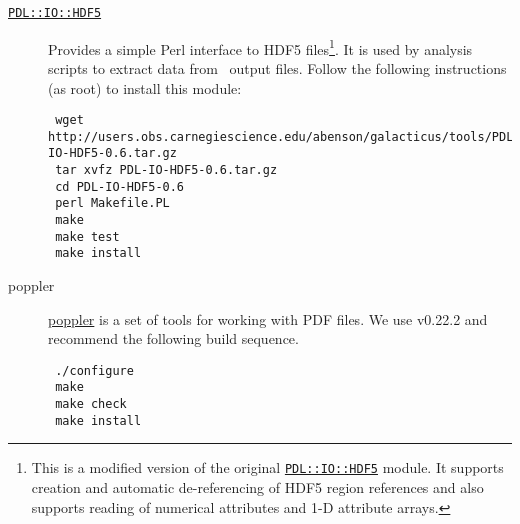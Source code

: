 \begin{description}
\item [\href{http://users.obs.carnegiescience.edu/abenson/galacticus/tools/PDL-IO-HDF5-0.6.tar.gz}{{\tt PDL::IO::HDF5}}] Provides a simple Perl interface to HDF5 files\footnote{This is a modified version of the  original \protect\href{http://search.cpan.org/~cerney/PDL-IO-HDF5-0.63/}{{\tt PDL::IO::HDF5}} module. It supports creation and automatic de-referencing of HDF5 region references and also supports reading of numerical attributes and 1-D attribute arrays.}. It is used by analysis scripts to extract data from \glc\ output files. Follow the following instructions (as root) to install this module:
\begin{verbatim}
 wget http://users.obs.carnegiescience.edu/abenson/galacticus/tools/PDL-IO-HDF5-0.6.tar.gz
 tar xvfz PDL-IO-HDF5-0.6.tar.gz
 cd PDL-IO-HDF5-0.6
 perl Makefile.PL
 make
 make test
 make install
\end{verbatim}

\item [poppler] \href{http://poppler.freedesktop.org/}{poppler} is a set of tools for working with PDF files. We use v0.22.2 and recommend the following build sequence. 
\begin{verbatim}
 ./configure
 make
 make check
 make install
\end{verbatim}


\end{description}

